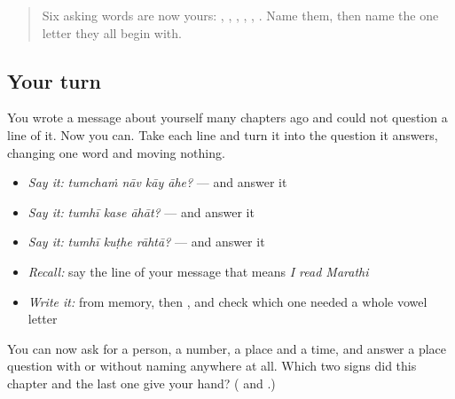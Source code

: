 \label{lesson:MR-R40-asking-column}



\begin{quote}
Six asking words are now yours: \textbf{}, \textbf{}, \textbf{}, \textbf{}, \textbf{}, \textbf{}. Name them, then name the one letter they all begin with.
\end{quote}

\subsection*{Your turn}
You wrote a message about yourself many chapters ago and could not question a line of it. Now you can. Take each line and turn it into the question it answers, changing one word and moving nothing.

\begin{itemize}
\raggedright
  \item \emph{Say it:} \emph{tumchaṁ nāv kāy āhe?} — and answer it
  \item \emph{Say it:} \emph{tumhī kase āhāt?} — and answer it
  \item \emph{Say it:} \emph{tumhī kuṭhe rāhtā?} — and answer it
  \item \emph{Recall:} say the line of your message that means \emph{I read Marathi}
  \item \emph{Write it:} \textbf{} from memory, then \textbf{}, and check which one needed a whole vowel letter
\end{itemize}

\begin{tcolorbox}[breakable,colback=teal!4,colframe=teal!35!black,title={Before you move on}]
You can now ask for a person, a number, a place and a time, and answer a place question with \textbf{} or \textbf{} without naming anywhere at all. Which two signs did this chapter and the last one give your hand? (\textbf{} and \textbf{}.)
\end{tcolorbox}
